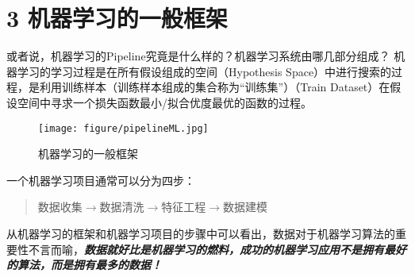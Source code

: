 \documentclass[twoside]{article}
\begin{document}
\section*{3  机器学习的一般框架}
或者说，机器学习的Pipeline究竟是什么样的？机器学习系统由哪几部分组成？
机器学习的学习过程是在所有假设组成的空间（Hypothesis Space）中进行搜索的过程，是利用训练样本（训练样本组成的集合称为“训练集”）（Train Dataset）在假设空间中寻求一个损失函数最小/拟合优度最优的函数的过程。
\begin{figure}[h]
    \centering
    \texttt{[image: figure/pipelineML.jpg]}
\caption{机器学习的一般框架}
\end{figure}


一个机器学习项目通常可以分为四步：
\begin{quotation}
    \centering
    数据收集$\longrightarrow$数据清洗$\longrightarrow$特征工程$\longrightarrow$数据建模
\end{quotation}
从机器学习的框架和机器学习项目的步骤中可以看出，数据对于机器学习算法的重要性不言而喻，\textit{\textbf{数据就好比是机器学习的燃料，成功的机器学习应用不是拥有最好的算法，而是拥有最多的数据！}}
\end{document}

